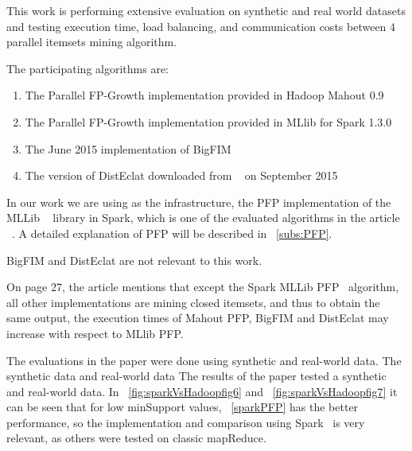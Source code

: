 This work is performing extensive evaluation on synthetic and real world datasets and testing execution time, load balancing, and communication costs between 4 parallel itemsets mining algorithm.

The participating algorithms are:
\begin{enumerate}[label=\textbf{SparkVsHadoop.\arabic*}]
\item \label{hadoopPFP} The Parallel FP-Growth implementation provided in Hadoop  Mahout 0.9 ~\cite{mahoot}
\item \label{sparkPFP} The Parallel FP-Growth implementation provided in MLlib for Spark
1.3.0 ~\cite{mllib}
\item The June 2015 implementation of BigFIM ~\cite{bigfim} 
\item The version of DistEclat downloaded from ~\cite{bigfim} on September 2015
\end{enumerate}
In our work we are using as the infrastructure, the PFP implementation of the MLLib ~\cite{mllib} library in Spark,  which is one of the evaluated algorithms in the article ~\cite{APILETTI201767}. A detailed explanation of PFP will be described in ~\autoref{subs:PFP}.

BigFIM and DistEclat are not relevant to this work.

On page 27, the article mentions that except the Spark MLLib PFP~\cite{mllib} algorithm, all other implementations are mining closed itemsets,  and thus to obtain the
same output, the execution times of Mahout PFP, BigFIM and DistEclat may increase
with respect to MLlib PFP.

The evaluations in the paper were done using synthetic and real-world data.
The synthetic data and real-world data 
The results of the paper tested a synthetic and real-world data. In ~\autoref{fig:sparkVsHadoopfig6} and ~\autoref{fig:sparkVsHadoopfig7} it can be seen that for low minSupport values,  ~\autoref{sparkPFP} has the better performance, so the implementation and comparison using Spark~\cite{spark} is very relevant, as others were tested on classic mapReduce.



